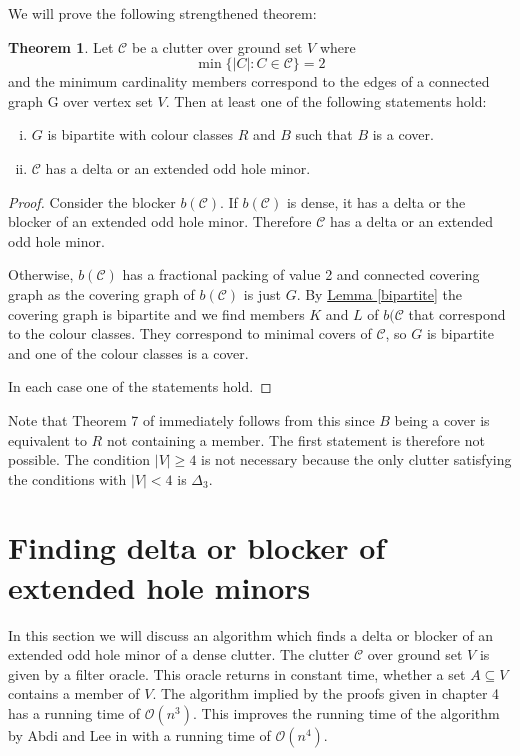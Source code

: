\documentclass[a4paper, 12pt]{scrbook}
\theoremstyle{definition}
\newtheorem{theorem}{Theorem}[chapter]
\begin{document}
   We will prove the following strengthened theorem:
   \begin{theorem}
       Let $\mathcal{C}$ be a clutter over ground set $V$ where
       \[
           \min\{|C|: C \in \mathcal{C}\} = 2
           \]
           and the minimum cardinality members correspond to the edges of a connected graph G over vertex set $V$.
           Then at least one of the following statements hold:
           \leavevmode
           \begin{enumerate}[(i)]
               \item $G$ is bipartite with colour classes $R$ and $B$ such that $B$ is a cover.
               \item $\mathcal{C}$ has a delta or an extended odd hole minor.
           \end{enumerate}
    \end{theorem}

   \begin{proof}
       Consider the blocker $b(\mathcal{C})$.
       If $b(\mathcal{C})$ is dense, it has a delta or the blocker of an extended odd hole minor.
       Therefore $\mathcal{C}$ has a delta or an extended odd hole minor.

       Otherwise, $b(\mathcal{C})$ has a fractional packing of value 2 and connected covering graph as the covering graph of $b(\mathcal{C})$ is just $G$.
       By \hyperref[bipartite]{Lemma \ref*{bipartite}} the covering graph is bipartite and we find members $K$ and $L$ of $b(\mathcal{C}$ that correspond to the colour classes. They correspond to minimal covers of $\mathcal{C}$, so $G$ is bipartite and one of the colour classes is a cover.

       In each case one of the statements hold.
   \end{proof}

   Note that Theorem 7 of \cite{deltas} immediately follows from this since $B$ being a cover is equivalent to $R$ not containing a member. The first statement is therefore not possible. The condition $|V|\geq 4$ is not necessary because the only clutter satisfying the conditions with $|V|<4$ is $\Delta_3$.

   \chapter{Finding delta or blocker of extended hole minors}
   In this section we will discuss an algorithm which finds a delta or blocker of an extended odd hole minor of a dense clutter.
   The clutter $\mathcal{C}$ over ground set $V$ is given by a filter oracle.
   This oracle returns in constant time, whether a set $A \subseteq V$ contains a member of $V$.
   The algorithm implied by the proofs given in chapter 4 has a running time of $\mathcal{O}(n^3)$.
   This improves the running time of the algorithm by Abdi and Lee in \cite{deltas} with a running time of $\mathcal{O}(n^4)$.
\end{document}
